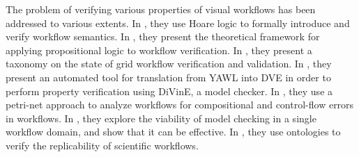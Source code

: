 \begin{comment}
It is possible to translate live sequence charts to LTL \cite{KUMAR, KUMAR2009137}. These translations result in large intractable formulas whereas the work here creates several connected small formulas that are easy for SPIN. UML modeling uses \emph{synchronous observer automata} to encode and verify safety properties \cite{8906967}. The CWP can be thought of as a synchronous observer, and it is possible to express it in SPIN for safety verification, but that complicates existential properties and may result in a larger state space. Other work verifies that UML state diagrams implement their associated activity diagrams (workflows) with the NuSMV model checker \cite{7436156}. The workflows are turned into LTL, just opposite of the work here. That said, it is possible to extract a CWP from workflow models, in which case the intent is to discover what the system will accomplish.

There is some work related in translating models in the \emph{Business Process Execution Language} (BPEL) to Promela \cite{bpelToPromela}. The semantics are different and is limited in scope to web-services. BPMN choreographies have been modeled in Promela and verified with SPIN for deadlock, but choreographies ignore workflows and only model message sequencing \cite{choreography}. The translation of BPMN to Promela is inspired by existing methods for turning Petri Nets into equivalent Promela models \cite{petrinetToPromela, petrinetInspiration}. These however do not include data. The translation in this paper is also based off of early prototype translations of BPMN to Promela using message channels for synchronization \cite{bpmn2promela} whereas the translation here uses global variables to mitigate state explosion.
\end{comment}

The problem of verifying various properties of visual workflows has been addressed to various extents. In \cite{workflowVerification1}, they use Hoare logic to formally introduce and verify workflow semantics. In \cite{workflowVerification2}, they present the theoretical framework for applying propositional logic to workflow verification. In \cite{workflowVerification3}, they present a taxonomy on the state of grid workflow verification and validation. In \cite{workflowVerification4}, they present an automated tool for translation from YAWL into DVE in order to perform property verification using DiVinE, a model checker. In \cite{workflowVerification5}, they use a petri-net approach to analyze workflows for compositional and control-flow errors in workflows. In \cite{workflowVerification6}, they explore the viability of model checking in a single workflow domain, and show that it can be effective. In \cite{workflowVerification7}, they use ontologies to verify the replicability of scientific workflows.

